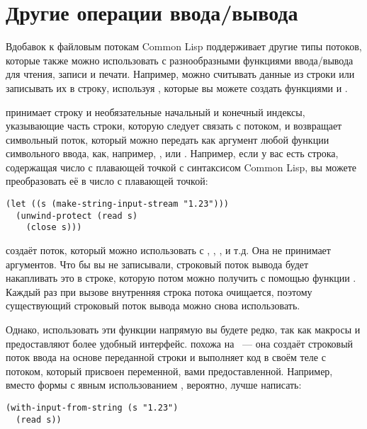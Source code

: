 \section{Другие операции ввода/вывода}

Вдобавок к файловым потокам Common Lisp поддерживает другие типы потоков, которые также
можно использовать с разнообразными функциями ввода/вывода для чтения, записи и
печати. Например, можно считывать данные из строки или записывать их в строку, используя
, которые вы можете создать функциями 
и .

 принимает строку и необязательные начальный и конечный
индексы, указывающие часть строки, которую следует связать с потоком, и возвращает
символьный поток, который можно передать как аргумент любой функции символьного ввода,
как, например, ,  или . Например, если у вас
есть строка, содержащая число с плавающей точкой с синтаксисом Common Lisp, вы можете
преобразовать её в число с плавающей точкой:

\begin{lstlisting}
(let ((s (make-string-input-stream "1.23"))) 
  (unwind-protect (read s) 
    (close s))) 
\end{lstlisting}

 создаёт поток, который можно использовать с
, , ,  и т.д. Она не принимает
аргументов. Что бы вы не записывали, строковый поток вывода будет накапливать это в
строке, которую потом можно получить с помощью функции
. Каждый раз при вызове 
внутренняя строка потока очищается, поэтому существующий строковый поток вывода можно
снова использовать.

Однако, использовать эти функции напрямую вы будете редко, так как макросы
 и  предоставляют более удобный
интерфейс.  похожа на ~--- она создаёт
строковый поток ввода на основе переданной строки и выполняет код в своём теле с потоком,
который присвоен переменной, вами предоставленной. Например, вместо формы  с
явным использованием , вероятно, лучше написать:

\begin{lstlisting}
(with-input-from-string (s "1.23") 
  (read s))
\end{lstlisting}


